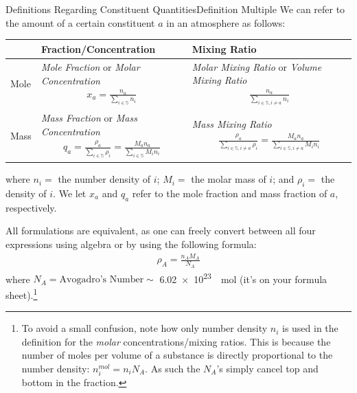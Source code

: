 \begin{fact}{Definitions Regarding Constituent Quantities}{Definition Multiple}\label{Definition Multiple}
    We can refer to the amount of a certain constituent $a$ in an atmosphere as follows:\newline\newline
    \begin{tabular}{|p{0.8cm}|p{6.5cm}|p{7.5cm}|}
        \hline
        & Fraction/Concentration & Mixing Ratio \\
        \hline
        Mole & \textit{Mole Fraction} or \textit{Molar Concentration} \begin{align*}
            x_a=\frac{n_a}{\sum\limits_{i\in\mathbb{S}} n_i}
        \end{align*} & \textit{Molar Mixing Ratio} or \textit{Volume Mixing Ratio} \begin{align*}
            \frac{n_a}{\sum\limits_{i\in\mathbb{S},i\neq a} n_i}
        \end{align*}
        \\
        \hline
        Mass & \textit{Mass Fraction} or \textit{Mass Concentration} \begin{align*}
            q_a=\frac{\rho_a}{\sum\limits_{i\in\mathbb{S}} \rho_i}
            =
            \frac{M_an_a}{\sum\limits_{i\in\mathbb{S}} M_in_i}
        \end{align*} & \textit{Mass Mixing Ratio} \begin{align*}
            \frac{\rho_a}{\sum\limits_{i\in\mathbb{S},i\neq a} \rho_i}
            =
            \frac{M_an_a}{\sum\limits_{i\in\mathbb{S},i\neq a} M_in_i}
        \end{align*}\\
        \hline
    \end{tabular}\newline

    where $n_i=$ the number density of $i$; $M_i=$ the molar mass of $i$; and $\rho_i=$ the density of $i$. We let $x_a$ and $q_a$ refer to the mole fraction and mass fraction of $a$, respectively.

    All formulations are equivalent, as one can freely convert between all four expressions using algebra or by using the following formula:
    \begin{align}\label{density to number}
        \rho_A=\frac{n_AM_A}{N_A}
    \end{align}
    where $N_A=\text{Avogadro's Number}\sim$ \qty{6.02e23}{\per\mole} (it's on your formula sheet).\footnote{
        To avoid a small confusion, note how only number density $n_i$ is used in the definition for the \textit{molar} concentrations/mixing ratios. This is because the number of moles per volume of a substance is directly proportional to the number density: $n_i^{mol}=n_iN_A$. As such the $N_A$'s simply cancel top and bottom in the fraction.
    } 
\end{fact}

